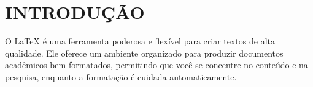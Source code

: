 
\chapter{INTRODUÇÃO}
\label{chap:introducao}

O \LaTeX{} é uma ferramenta poderosa e flexível para criar textos de alta qualidade. Ele oferece um ambiente organizado para produzir documentos acadêmicos bem formatados, permitindo que você se concentre no conteúdo e na pesquisa, enquanto a formatação é cuidada automaticamente.
